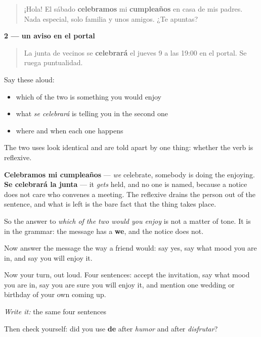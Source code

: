 \begin{quote}
¡Hola! El sábado \textbf{celebramos} mi \textbf{cumpleaños} en casa de mis padres. Nada especial, solo familia y unos amigos. ¿Te apuntas?
\end{quote}

\textbf{2 — un aviso en el portal}

\begin{quote}
La junta de vecinos se \textbf{celebrará} el jueves 9 a las 19:00 en el portal. Se ruega puntualidad.
\end{quote}

Say these aloud:

\begin{itemize}
\raggedright
  \item which of the two is something you would enjoy
  \item what \emph{se celebrará} is telling you in the second one
  \item where and when each one happens
\end{itemize}

\begin{culture}
The two uses look identical and are told apart by one thing: whether the verb is reflexive.

\textbf{Celebramos mi cumpleaños} — \emph{we} celebrate, somebody is doing the enjoying. \textbf{Se celebrará la junta} — it \emph{gets} held, and no one is named, because a notice does not care who convenes a meeting. The reflexive drains the person out of the sentence, and what is left is the bare fact that the thing takes place.

So the answer to \emph{which of the two would you enjoy} is not a matter of tone. It is in the grammar: the message has a \textbf{we}, and the notice does not.

Now answer the message the way a friend would: say yes, say what mood you are in, and say you will enjoy it.
\end{culture}

\begin{tcolorbox}[breakable,colback=teal!4,colframe=teal!35!black,title={Before you move on}]
Now your turn, out loud. Four sentences: accept the invitation, say what mood you are in, say you are sure you will enjoy it, and mention one wedding or birthday of your own coming up.

\emph{Write it:} the same four sentences

Then check yourself: did you use \textbf{de} after \emph{humor} and after \emph{disfrutar}?
\end{tcolorbox}

